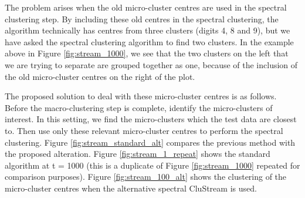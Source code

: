 The problem arises when the old micro-cluster centres are used in the spectral clustering step. By including these old centres in the spectral clustering, the algorithm technically has centres from three clusters (digits 4, 8 and 9), but we have asked the spectral clustering algorithm to find two clusters. In the example above in Figure \ref{fig:stream_1000}, we see that the two clusters on the left that we are trying to separate are grouped together as one, because of the inclusion of the old micro-cluster centres on the right of the plot.

The proposed solution to deal with these micro-cluster centres is as follows. Before the macro-clustering step is complete, identify the micro-clusters of interest. In this setting, we find the micro-clusters which the test data are closest to. Then use only these relevant micro-cluster centres to perform the spectral clustering. Figure \ref{fig:stream_standard_alt} compares the  previous method with the proposed alteration. Figure \ref{fig:stream_1_repeat} shows the standard algorithm at t = 1000 (this is a duplicate of Figure \ref{fig:stream_1000} repeated for comparison purposes). Figure \ref{fig:stream_100_alt} shows the clustering of the micro-cluster centres when the  alternative spectral CluStream is used. 

